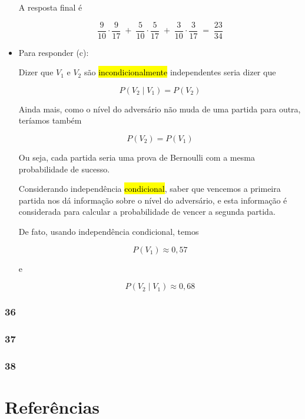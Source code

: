 \documentclass[
  11pt]{report}
\begin{document}
\begin{itemize}
  A resposta final é

  \[
  \frac{9}{10} \cdot \frac{9}{17} \;+\;
  \frac{5}{10} \cdot \frac{5}{17} \;+\;
  \frac{3}{10} \cdot \frac{3}{17}
  \;=\;
  \frac{23}{34}
  \]
\item
  Para responder (c):

  Dizer que $V_1$ e $V_2$ são {\hl{incondicionalmente}} independentes seria dizer que

  \[
  P(V_2 \mid V_1) = P(V_2)
  \]

  Ainda mais, como o nível do adversário não muda de uma partida para outra, teríamos também

  \[
  P(V_2) = P(V_1)
  \]

  Ou seja, cada partida seria uma prova de Bernoulli com a mesma probabilidade de sucesso.

  Considerando independência {\hl{condicional}}, saber que vencemos a primeira partida nos dá informação sobre o nível do adversário, e esta informação é considerada para calcular a probabilidade de vencer a segunda partida.

  De fato, usando independência condicional, temos

  \[
  P(V_1) \approx 0{,}57
  \]

  e

  \[
  P(V_2 \mid V_1) \approx 0{,}68
  \]
\end{itemize}

\hypertarget{section-21}{%
\subsection*{36}\label{section-21}}

\hypertarget{section-22}{%
\subsection*{37}\label{section-22}}

\hypertarget{section-23}{%
\subsection*{38}\label{section-23}}

\hypertarget{referuxeancias}{%
\chapter*{Referências}\label{referuxeancias}}
\end{document}
